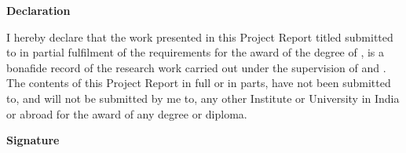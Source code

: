 \begin{flushright}
\huge{\textbf{Declaration}}
\end{flushright}

\vspace{0.5cm}

I hereby declare that the work presented in this Project Report titled \textbf{\ttitle} submitted to \univname{} in partial fulfilment of the requirements for the award of the degree of \degree{}, is a bonafide record of the research work carried out under the supervision of \supname{} and \cosupname{}. The contents of this Project Report in full or in parts, have not been submitted to, and will not be submitted by me to, any other Institute or University in India or abroad for the award of any degree or diploma.

\vspace{3cm}

\begin{flushright}
\large{\textbf{Signature}}\\[0.5cm]
\emph{\authorname}\\
\rn
\end{flushright}